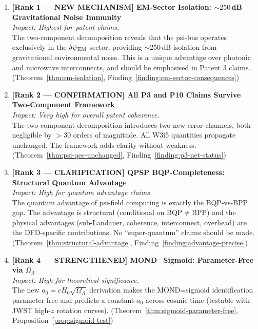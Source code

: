 \documentclass[11pt]{article}
\theoremstyle{definition}
\theoremstyle{remark}
\newcommand{\dpsiEM}{\delta\psi_{\rm EM}}
\begin{document}
\begin{enumerate}

\item \textbf{[Rank 1 --- NEW MECHANISM] EM-Sector Isolation: $\sim 250$\,dB
  Gravitational Noise Immunity}\\
  \textit{Impact: Highest for patent claims.}\\
  The two-component decomposition reveals that the psi-bus operates
  exclusively in the $\dpsiEM$ sector, providing $\sim 250$\,dB
  isolation from gravitational environmental noise. This is a unique
  advantage over photonic and microwave interconnects, and should be
  emphasised in Patent 3 claims.
  (Theorem~\ref{thm:em-isolation}, Finding~\ref{finding:em-sector-consequences})

\item \textbf{[Rank 2 --- CONFIRMATION] All P3 and P10 Claims Survive
  Two-Component Framework}\\
  \textit{Impact: Very high for overall patent coherence.}\\
  The two-component decomposition introduces two new error channels,
  both negligible by $>30$ orders of magnitude. All W3i5 quantities
  propagate unchanged. The framework adds clarity without weakness.
  (Theorem~\ref{thm:psi-qec-unchanged}, Finding~\ref{finding:p3-net-status})

\item \textbf{[Rank 3 --- CLARIFICATION] QPSP BQP-Completeness:
  Structural Quantum Advantage}\\
  \textit{Impact: High for quantum advantage claims.}\\
  The quantum advantage of psi-field computing is exactly the BQP-vs-BPP
  gap. The advantage is structural (conditional on BQP$\neq$BPP) and
  the physical advantages (sub-Landauer, coherence, interconnect, overhead)
  are the DFD-specific contributions. No ``super-quantum'' claims should
  be made.
  (Theorem~\ref{thm:structural-advantage}, Finding~\ref{finding:advantage-precise})

\item \textbf{[Rank 4 --- STRENGTHENED] MOND=Sigmoid: Parameter-Free
  via $\Omega_\Lambda$}\\
  \textit{Impact: High for theoretical significance.}\\
  The new $a_0 = cH_0\sqrt{\Omega_\Lambda}$ derivation makes the
  MOND=sigmoid identification parameter-free and predicts a constant
  $a_0$ across cosmic time (testable with JWST high-$z$ rotation curves).
  (Theorem~\ref{thm:sigmoid-parameter-free}, Proposition~\ref{prop:sigmoid-test})


\end{enumerate}
\end{document}
